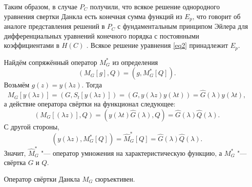 \smallskip 
Таким образом, в случае $P_C$ получили, что всякое решение однородного уравнения свертки Данкла есть конечная сумма функций из $E_p$, что говорит об аналоге представления решений в $P_C$ с фундаментальным принципом Эйлера для дифференциальных уравнений конечного порядка с постоянными коэффициентами в $H(C)$ \cite{zabirova4}. Всякое решение уравнения \eqref{eq2} принадлежит $E_p$.

Найдём сопряжённый оператор $M_G^*$ из определения
 $$(M_G[g],Q)=(g,M_G^*[Q]).$$ 
Возьмём $g(z)=y(\lambda z).$ Тогда $$M_G[y(\lambda z)]=(G,S_t[y(\lambda z)])=(G,y(\lambda z)y(\lambda t))=\hat G(\lambda)y(\lambda t),$$ а действие оператора свёртки на функционал следующее:  $$(M_G[(\lambda z)],Q)=(y(\lambda t)\hat G(\lambda),Q)=\hat G(\lambda)\hat Q(\lambda).$$ 
С другой стороны, $$(y(\lambda z),M^*_G[Q])=\widehat M^*_G[Q]=\hat G(\lambda)\hat Q(\lambda).$$ 
Значит, $\hat M^*_G$ "--- оператор умножения на характеристическую функцию, а $M^*_G$ "--- свёртка $G$ и $Q$.

\pagebreak

\begin{theorem}[5] Оператор свёртки Данкла $M_G$ сюръективен{\rm .}\end{theorem}

\smallskip


